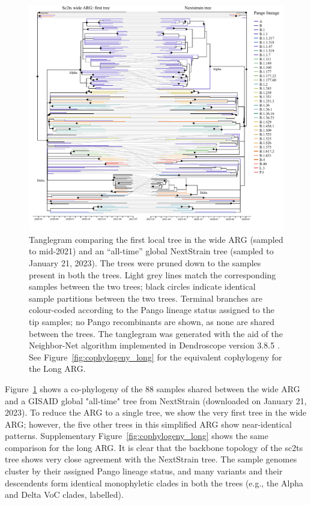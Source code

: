 \documentclass{article}
\begin{document}
\begin{figure} \centering
\includegraphics[width=\textwidth]{figures/cophylogeny_wide.pdf}
\caption{\label{fig:cophylogeny}
Tanglegram comparing the first local tree in the wide ARG (sampled to mid-2021)
and an ``all-time'' global NextStrain tree (sampled to January 21, 2023). The
trees were pruned down to the samples present in both the trees. Light grey
lines match the corresponding samples between the two trees; black circles
indicate identical sample partitions between the two trees. Terminal branches
are colour-coded according to the Pango lineage status assigned to the tip
samples; no Pango recombinants are shown, as none are shared between the trees.
The tanglegram was generated with the aid of the Neighbor-Net algorithm
\citep{Scornavacca2011-mg} implemented in Dendroscope version 3.8.5
\citep{Huson2012-ys}. See Figure~\ref{fig:cophylogeny_long} for the equivalent
cophylogeny for the Long ARG.}
\end{figure}

Figure~\ref{fig:cophylogeny} shows a co-phylogeny of the 88 samples shared
between the wide ARG and a GISAID global "all-time" tree from NextStrain
(downloaded on January 21, 2023). To reduce the ARG to a single tree, we show
the very first tree in the wide ARG; however, the five other trees in this
simplified ARG show near-identical patterns. Supplementary
Figure~\ref{fig:cophylogeny_long} shows the same comparison for the long ARG.
It is clear that the backbone topology of the sc2ts tree shows very close
agreement with the NextStrain tree. The sample genomes cluster by their
assigned Pango lineage status, and many variants and their descendents form
identical monophyletic clades in both the trees (e.g., the Alpha and Delta VoC
clades, labelled).
\end{document}
